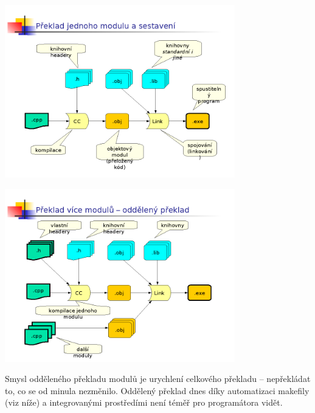 \par\begin{center}\includegraphics[width=10cm]{informatika/programovanie/obrazky/oddelenypreklad01.png}
\end{center}
\par\begin{center}\includegraphics[width=10cm]{informatika/programovanie/obrazky/oddelenypreklad02.png}\end{center}
Smysl odděleného překladu modulů je urychlení celkového překladu -- nepřekládat to, co se od minula nezměnilo. Oddělený překlad dnes díky automatizaci makefily (viz níže) a integrovanými prostředími není téměř pro programátora vidět.

